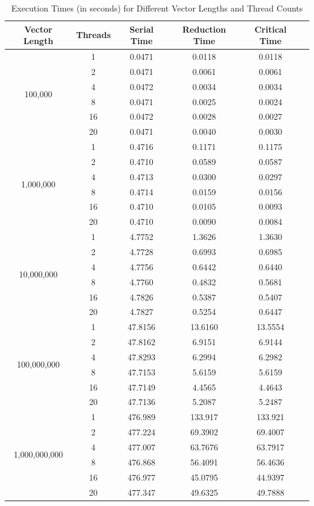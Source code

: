 \documentclass[unicode,11pt,a4paper,oneside,numbers=endperiod,openany]{scrartcl}
\begin{document}
\begin{table}[ht]
    \centering
    \caption{Execution Times (in seconds) for Different Vector Lengths and Thread Counts}
    \begin{tabular}{@{}cccccc@{}}
        \toprule
        \textbf{Vector Length} & \textbf{Threads} & \textbf{Serial Time} & \textbf{Reduction Time} & \textbf{Critical Time} \\ \midrule
        \multirow{6}{*}{100,000} 
        & 1  & 0.0471 & 0.0118 & 0.0118 \\
        & 2  & 0.0471 & 0.0061 & 0.0061 \\
        & 4  & 0.0472 & 0.0034 & 0.0034 \\
        & 8  & 0.0471 & 0.0025 & 0.0024 \\
        & 16 & 0.0472 & 0.0028 & 0.0027 \\
        & 20 & 0.0471 & 0.0040 & 0.0030 \\
        \midrule
        \multirow{6}{*}{1,000,000} 
        & 1  & 0.4716 & 0.1171 & 0.1175 \\
        & 2  & 0.4710 & 0.0589 & 0.0587 \\
        & 4  & 0.4713 & 0.0300 & 0.0297 \\
        & 8  & 0.4714 & 0.0159 & 0.0156 \\
        & 16 & 0.4710 & 0.0105 & 0.0093 \\
        & 20 & 0.4710 & 0.0090 & 0.0084 \\
        \midrule
        \multirow{6}{*}{10,000,000} 
        & 1  & 4.7752 & 1.3626 & 1.3630 \\
        & 2  & 4.7728 & 0.6993 & 0.6985 \\
        & 4  & 4.7756 & 0.6442 & 0.6440 \\
        & 8  & 4.7760 & 0.4832 & 0.5681 \\
        & 16 & 4.7826 & 0.5387 & 0.5407 \\
        & 20 & 4.7827 & 0.5254 & 0.6447 \\
        \midrule
        \multirow{6}{*}{100,000,000} 
        & 1  & 47.8156 & 13.6160 & 13.5554 \\
        & 2  & 47.8162 & 6.9151 & 6.9144 \\
        & 4  & 47.8293 & 6.2994 & 6.2982 \\
        & 8  & 47.7153 & 5.6159 & 5.6159 \\
        & 16 & 47.7149 & 4.4565 & 4.4643 \\
        & 20 & 47.7136 & 5.2087 & 5.2487 \\
        \midrule
        \multirow{6}{*}{1,000,000,000} 
        & 1  & 476.989 & 133.917 & 133.921 \\
        & 2  & 477.224 & 69.3902 & 69.4007 \\
        & 4  & 477.007 & 63.7676 & 63.7917 \\
        & 8  & 476.868 & 56.4091 & 56.4636 \\
        & 16 & 476.977 & 45.0795 & 44.9397 \\
        & 20 & 477.347 & 49.6325 & 49.7888 \\
        \bottomrule
    \end{tabular}
    \label{tab:experiment_times}
\end{table}
\end{document}
